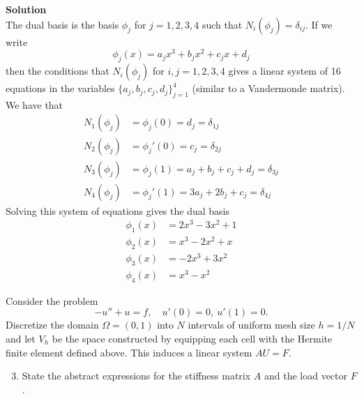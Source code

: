 \documentclass[11pt]{article}
\begin{document}
\begin{enumerate}
\begin{enumerate}
{\bf Solution}\\
The dual basis is the basis $\phi_{j}$ for $j=1,2,3,4$ such that $N_i(\phi_j) = \delta_{ij}$.  If we write
\[
\phi_j(x) = a_jx^3 + b_jx^2 + c_jx + d_j
\]
then the conditions that $N_i(\phi_j)$ for $i,j = 1,2,3,4$ gives a linear system of 16 equations in the variables $\{a_j,b_j,c_j,d_j\}_{j=1}^4$ (similar to a Vandermonde matrix).  We have that
\begin{align*}
N_1(\phi_j) &= \phi_j(0) = d_j = \delta_{1j}\\
N_2(\phi_j) &= \phi_j'(0) = c_j = \delta_{2j}\\
N_3(\phi_j) &= \phi_j(1) = a_j + b_j + c_j + d_j = \delta_{3j}\\
N_4(\phi_j) &= \phi_j'(1) = 3a_j + 2b_j + c_j = \delta_{4j}
\end{align*}
Solving this system of equations gives the dual basis
\begin{align*}
\phi_1(x) &= 2x^3 - 3x^2 + 1\\
\phi_2(x) &= x^3 - 2x^2 + x\\
\phi_3(x) &= -2x^3  +3x^2\\
\phi_4(x) &= x^3 - x^2 
\end{align*}


  \end{enumerate}
 Consider the problem
 \begin{equation}
   -u'' + u = f, \quad u'(0) = 0,\: u'(1)=0.
 \end{equation}
 Discretize the domain $\Omega=(0,1)$ into $N$ intervals of uniform
 mesh size $h=1/N$ and let $V_h$ be the space constructed by
 equipping each cell with the Hermite finite element defined
 above. This induces a linear system $AU=F$.
 \begin{enumerate}

 \setcounter{enumii}{2}
 \item State the abstract expressions for the stiffness matrix $A$
   and the load vector $F$.\\
\\


\end{enumerate}
\end{enumerate}
\end{document}
